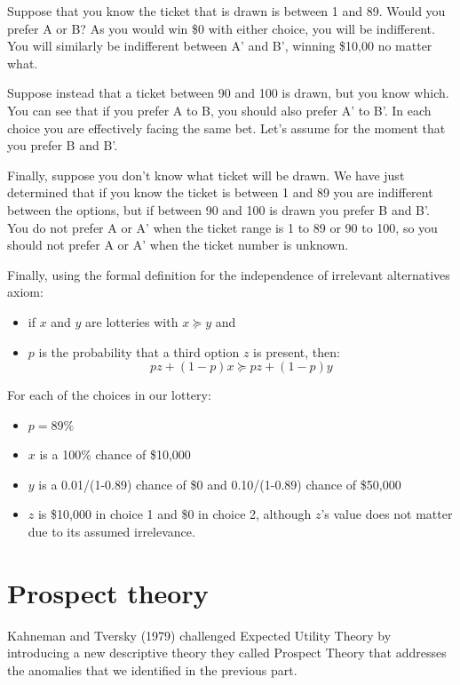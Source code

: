 \documentclass[
  letterpaper,
  DIV=11,
  numbers=noendperiod]{scrreprt}
\providecommand{\tightlist}{%
  \setlength{\itemsep}{0pt}\setlength{\parskip}{0pt}}\usepackage{longtable,booktabs,array}
\begin{document}
\begin{tcolorbox}
Suppose that you know the ticket that is drawn is between 1 and 89.
Would you prefer A or B? As you would win \$0 with either choice, you
will be indifferent. You will similarly be indifferent between A' and
B', winning \$10,00 no matter what.

Suppose instead that a ticket between 90 and 100 is drawn, but you know
which. You can see that if you prefer A to B, you should also prefer A'
to B'. In each choice you are effectively facing the same bet. Let's
assume for the moment that you prefer B and B'.

Finally, suppose you don't know what ticket will be drawn. We have just
determined that if you know the ticket is between 1 and 89 you are
indifferent between the options, but if between 90 and 100 is drawn you
prefer B and B'. You do not prefer A or A' when the ticket range is 1 to
89 or 90 to 100, so you should not prefer A or A' when the ticket number
is unknown.

Finally, using the formal definition for the independence of irrelevant
alternatives axiom:

\begin{itemize}
\tightlist
\item
  if \(x\) and \(y\) are lotteries with \(x\succcurlyeq y\) and
\item
  \(p\) is the probability that a third option \(z\) is present, then:
  \[
  pz+(1-p)x\succcurlyeq pz+(1-p)y
  \]
\end{itemize}

For each of the choices in our lottery:

\begin{itemize}
\item
  \(p=89\%\)
\item
  \(x\) is a 100\% chance of \$10,000
\item
  \(y\) is a 0.01/(1-0.89) chance of \$0 and 0.10/(1-0.89) chance of
  \$50,000
\item
  \(z\) is \$10,000 in choice 1 and \$0 in choice 2, although \(z\)'s
  value does not matter due to its assumed irrelevance.
\end{itemize}

\end{tcolorbox}

\part{Prospect theory}

Kahneman and Tversky (1979) challenged Expected Utility Theory by
introducing a new descriptive theory they called Prospect Theory that
addresses the anomalies that we identified in the previous part.
\end{document}
